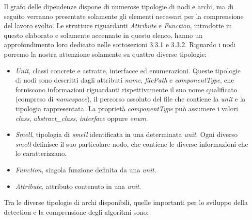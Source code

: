         Il grafo delle dipendenze dispone di numerose tipologie di nodi e archi, ma di seguito verranno presentate solamente gli elementi necessari per la comprensione del lavoro svolto. Le strutture riguardanti \textit{Attribute} e \textit{Function}, introdotte in questo elaborato e solamente accennate in questo elenco, hanno un approfondimento loro dedicato nelle sottosezioni 3.3.1 e 3.3.2.
        Riguardo i nodi porremo la nostra attenzione solamente su quattro diverse tipologie:
        \begin{itemize}
            \item \textit{Unit}, classi concrete e astratte, interfacce ed enumerazioni. Queste tipologie di nodi sono descritti dagli attributi \textit{name}, \textit{filePath} e \textit{componentType}, che forniscono informazioni riguardanti rispettivamente il suo nome qualificato (compreso di \textit{namespace}), il percorso assoluto del file che contiene la \textit{unit} e la tipologia rappresentata. La proprietà \textit{componentType} può assumere i valori \textit{class}, \textit{abstract\_class}, \textit{interface} oppure \textit{enum}.  
            
            \item \textit{Smell}, tipologia di \textit{smell} identificata in una determinata \textit{unit}. Ogni diverso \textit{smell} definisce il suo particolare nodo, che contiene le diverse informazioni che lo caratterizzano. 
            
            \item \textit{Function}, singola funzione definita da una \textit{unit}.
            
            \item \textit{Attribute}, attributo contenuto in una \textit{unit}.
        \end{itemize}
        Tra le diverse tipologie di archi disponibili, quelle importanti per lo sviluppo della detection e la comprensione degli algoritmi sono:
